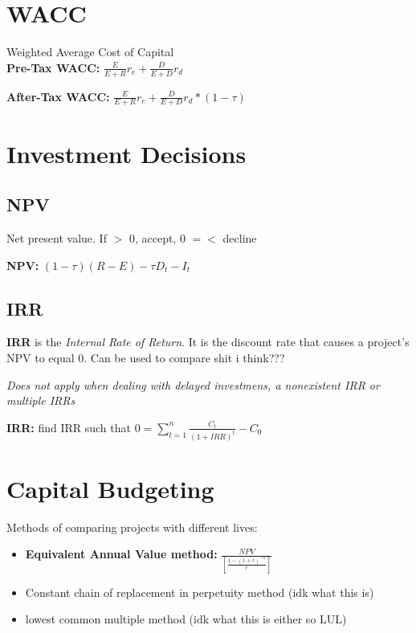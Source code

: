 \documentclass{report}
\begin{document}
\section{WACC}
\label{sec:wacc}
 Weighted Average Cost of Capital\\

\textbf{Pre-Tax WACC:} $\frac{E}{E+R}r_e+\frac{D}{E+D}r_d$

\textbf{After-Tax WACC:} $\frac{E}{E+R}r_e+\frac{D}{E+D}r_d*(1-\tau)$ 

\section{Investment Decisions}
\label{sec:invdec}


\subsection{NPV}
\label{subsec:npv}
Net present value. If $>$ 0, accept, 0 $=<$ decline

\vspace*{1\baselineskip}

\textbf{NPV:} $(1-\tau)(R-E)-\tau D_t-I_t$

\subsection{IRR}
\label{sec:irr}

\textbf{IRR} is the \textit{Internal Rate of Return}. It is the discount rate that causes a project's NPV to equal 0. Can be used to compare shit i think???

\textit{Does not apply when dealing with delayed investmens, a nonexistent IRR or multiple IRRs}

\vspace*{1\baselineskip}
\textbf{IRR:} find IRR such that $0=\sum_{t=1}^n\frac{C_t}{(1+IRR)^t}-C_0$

\section{Capital Budgeting}
\label{sec:capital-budgeting}

Methods of comparing projects with different lives:
\begin{itemize}
\item \textbf{Equivalent Annual Value method:} $\frac{NPV}{[\frac{1-(1+r)^{-n}}{r}]}$
\item Constant chain of replacement in perpetuity method (idk what this is)
\item lowest common multiple method (idk what this is either so LUL)
\end{itemize}
\end{document}
